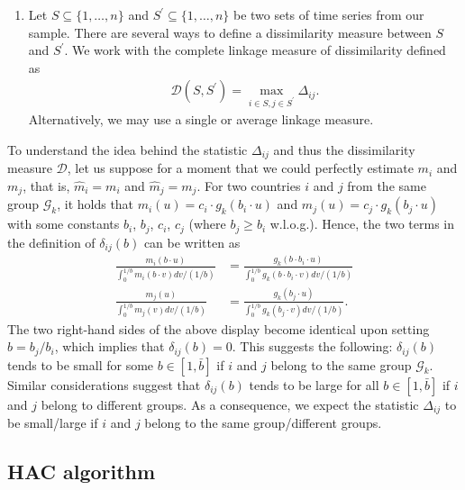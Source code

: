 \documentclass[a4paper,12pt]{article}
\numberwithin{equation}{section}
\begin{document}
\begin{enumerate}[label=\textit{Step \arabic*.},leftmargin=1.45cm]
\item Let $S \subseteq \{1, \ldots, n\}$ and $S^\prime \subseteq \{1, \ldots, n\}$ be two sets of time series from our sample. There are several ways to define a dissimilarity measure between $S$ and $S^\prime$. We work with the complete linkage measure of dissimilarity defined as 
\begin{align*}
\mathcal{D} (S, S^\prime) = \max_{i \in S, j\in S^\prime} \Delta_{ij}.
\end{align*}
Alternatively, we may use a single or average linkage measure. 


\end{enumerate}


To understand the idea behind the statistic $\Delta_{ij}$ and thus the dissimilarity measure $\mathcal{D}$, let us suppose for a moment that we could perfectly estimate $m_i$ and $m_j$, that is, $\hat{m}_i = m_i$ and $\hat{m}_j = m_j$. For two countries $i$ and $j$ from the same group $\mathcal{G}_k$, it holds that $m_i(u) = c_i \cdot g_k(b_i \cdot u)$ and $m_j(u) = c_j \cdot g_k(b_j \cdot u)$ with some constants $b_i$, $b_j$, $c_i$, $c_j$ (where $b_j \ge b_i$ w.l.o.g.). Hence, the two terms in the definition of $\delta_{ij}(b)$ can be written as  
\begin{align*}
\frac{m_i (b\cdot u)}{\int_0^{1/b} m_i(b\cdot v) dv /(1/b)} & = \frac{g_k (b \cdot b_i \cdot u)}{\int_0^{1/b} g_k(b \cdot b_i \cdot v) dv /(1/b)} \\
\frac{m_j (u)}{\int_0^{1/b} m_j(v) dv /(1/b)} & = \frac{g_k (b_j \cdot u)}{\int_0^{1/b} g_k(b_j \cdot v) dv /(1/b)}.
\end{align*}
The two right-hand sides of the above display become identical upon setting $b = b_j/b_i$, which implies that $\delta_{ij}(b) = 0$. This suggests the following: $\delta_{ij}(b)$ tends to be small for some $b \in [1,\bar{b}]$ if $i$ and $j$ belong to the same group $\mathcal{G}_k$. Similar considerations suggest that $\delta_{ij}(b)$ tends to be large for all $b \in [1,\bar{b}]$ if $i$ and $j$ belong to different groups. As a consequence, we expect the statistic $\Delta_{ij}$ to be small/large if $i$ and $j$ belong to the same group/different groups. 


\subsection{HAC algorithm}\label{sec:alg}
\end{document}
